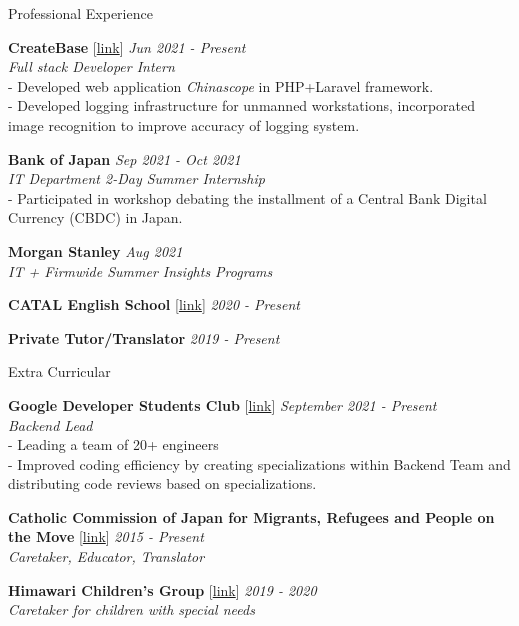 \documentclass{resume} %
\begin{document}
\begin{rSection}{Professional Experience}

{\bf CreateBase }[\href{https://createbase.work/}{link}] \hfill {\em Jun 2021 - Present} \\
{\textit{Full stack Developer Intern }}
\\- Developed web application \textit{Chinascope} in PHP+Laravel framework. 
\\- Developed logging infrastructure for unmanned workstations, incorporated image recognition to improve accuracy of logging system. 

{\bf Bank of Japan} \hfill {\em Sep 2021 - Oct 2021} \\
{\textit{IT Department 2-Day Summer Internship}}
\\- Participated in workshop debating the installment of a Central Bank Digital Currency (CBDC) in Japan.

{\bf Morgan Stanley} \hfill {\em Aug 2021} \\
{\textit{IT + Firmwide Summer Insights Programs}}

{\bf CATAL English School }[\href{https://catal.jp/}{link}] \hfill {\em 2020 - Present}

{\bf Private Tutor/Translator} \hfill {\em 2019 - Present} 

\end{rSection}

\begin{rSection}{Extra Curricular}

{\bf Google Developer Students Club }[\href{https://gdsc.community.dev/waseda-university/}{link}] \hfill {\em September 2021 - Present} \\
{\textit{Backend Lead}}\\
- Leading a team of 20+ engineers
\\- Improved coding efficiency by creating specializations within Backend Team and distributing code reviews based on specializations.


{\bf Catholic Commission of Japan for Migrants, Refugees and People on the
Move} [\href{https://www.cbcj.catholic.jp/english/japan/comt/migrantsrefugees_e/}{link}] \hfill {\em 2015 - Present} \\
{\textit{Caretaker, Educator, Translator}}

{\bf Himawari Children's Group } [\href{https://www.waseda.jp/inst/wavoc/news/2020/04/01/5313/}{link}] \hfill {\em 2019 - 2020} \\
{\textit{Caretaker for children with special needs}}

\end{rSection}
\end{document}
